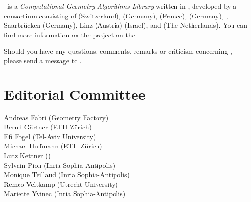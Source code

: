 
\cgal\ is a {\em Computational Geometry Algorithms Library} written in \CC, 
developed by a consortium consisting of
 (Switzerland), 
 (Germany), 
(France),
 (Germany),
,
Saarbr\"ucken (Germany),
 Linz (Austria)
 (Israel), and
 (The Netherlands). 
You can find more information on the project on the 
.

Should you have any questions, comments, remarks or criticism concerning 
\cgal, please send a message to 
.


\section*{Editorial Committee}

Andreas Fabri ({\sc Geometry Factory}) \\
Bernd G\"artner (ETH Z\"urich) \\
Efi Fogel (Tel-Aviv University) \\
Michael Hoffmann (ETH Z\"urich) \\
Lutz Kettner ()\\
Sylvain Pion ({\sc Inria} Sophia-Antipolis)\\
Monique Teillaud ({\sc Inria} Sophia-Antipolis)\\
Remco Veltkamp (Utrecht University)\\
Mariette Yvinec ({\sc Inria} Sophia-Antipolis)\\


